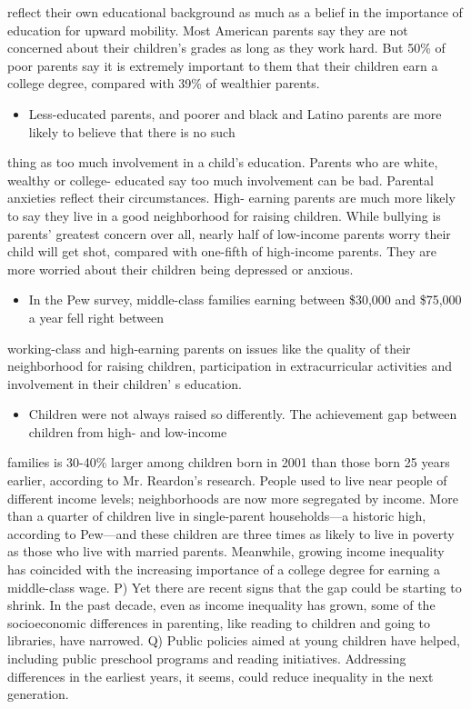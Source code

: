 \documentclass[UTF8,11pt]{ctexart}
\begin{document}
reflect their own educational background as much as a belief in the importance of education for upward mobility. Most American parents say they are not concerned about their children's grades as long as they work hard. But 50\% of poor parents say it is extremely important to them that their children earn a college degree, compared with 39\% of wealthier parents.


\begin{itemize}[leftmargin=2em,itemsep=.2em,topsep=.4em]\item[M.] Less-educated parents, and poorer and black and Latino parents are more likely to believe that there is no such
\end{itemize}

thing as too much involvement in a child's education. Parents who are white, wealthy or college- educated say too much involvement can be bad. Parental anxieties reflect their circumstances. High- earning parents are much more likely to say they live in a good neighborhood for raising children. While bullying is parents' greatest concern over all, nearly half of low-income parents worry their child will get shot, compared with one-fifth of high-income parents. They are more worried about their children being depressed or anxious.


\begin{itemize}[leftmargin=2em,itemsep=.2em,topsep=.4em]\item[N.] In the Pew survey, middle-class families earning between \$30,000 and \$75,000 a year fell right between
\end{itemize}

working-class and high-earning parents on issues like the quality of their neighborhood for raising children, participation in extracurricular activities and involvement in their children' s education.


\begin{itemize}[leftmargin=2em,itemsep=.2em,topsep=.4em]\item[O.] Children were not always raised so differently. The achievement gap between children from high- and low-income
\end{itemize}

families is 30-40\% larger among children born in 2001 than those born 25 years earlier, according to Mr. Reardon's research. People used to live near people of different income levels; neighborhoods are now more segregated by income. More than a quarter of children live in single-parent households—a historic high, according to Pew—and these children are three times as likely to live in poverty as those who live with married parents. Meanwhile, growing income inequality has coincided with the increasing importance of a college degree for earning a middle-class wage. P) Yet there are recent signs that the gap could be starting to shrink. In the past decade, even as income inequality has grown, some of the socioeconomic differences in parenting, like reading to children and going to libraries, have narrowed. Q) Public policies aimed at young children have helped, including public preschool programs and reading initiatives. Addressing differences in the earliest years, it seems, could reduce inequality in the next generation.
\end{document}
